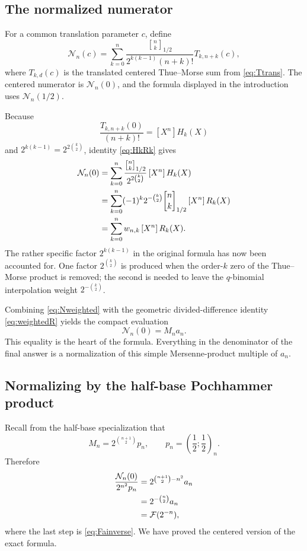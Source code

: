 \documentclass[11pt,oneside]{article}
\theoremstyle{definition}
\theoremstyle{remark}
\newcommand{\qpoch}[3]{\left(#1;#2\right)_{#3}}
\newcommand{\halfqbinom}[2]{{\genfrac{[}{]}{0pt}{}{#1}{#2}}_{1/2}}
\newcommand{\F}{\mathcal F}
\newcommand{\coeff}[2]{\left[#1^{#2}\right]}
\begin{document}
\subsection{The normalized numerator}

For a common translation parameter $c$, define
\begin{equation}\label{eq:Nncdef}
 \mathcal N_n(c)=
 \sum_{k=0}^{n}
 \frac{\halfqbinom{n}{k}}
      {2^{k(k-1)}(n+k)!}
 T_{k,n+k}(c),
\end{equation}
where $T_{k,d}(c)$ is the translated centered Thue--Morse sum from
\eqref{eq:Ttrans}.  The centered numerator is $\mathcal N_n(0)$, and the
formula displayed in the introduction uses $\mathcal N_n(1/2)$.

Because
\[
 \frac{T_{k,n+k}(0)}{(n+k)!}=\coeff{X}{n}H_k(X)
\]
and $2^{k(k-1)}=2^{2\binom{k}{2}}$, identity
\eqref{eq:HkRk} gives
\begin{align}
 \mathcal N_n(0)
 &=\sum_{k=0}^{n}
   \frac{\halfqbinom{n}{k}}{2^{2\binom{k}{2}}}
   \coeff{X}{n}H_k(X)\notag\\
 &=\sum_{k=0}^{n}
   (-1)^k2^{-\binom{k}{2}}\halfqbinom{n}{k}
   \coeff{X}{n}R_k(X)\notag\\
 &=\sum_{k=0}^{n}w_{n,k}\coeff{X}{n}R_k(X).\label{eq:Nweighted}
\end{align}
The rather specific factor $2^{k(k-1)}$ in the original formula has now
been accounted for.  One factor $2^{\binom{k}{2}}$ is produced when the
order-$k$ zero of the Thue--Morse product is removed; the second is needed
to leave the $q$-binomial interpolation weight
$2^{-\binom{k}{2}}$.

Combining \eqref{eq:Nweighted} with the geometric divided-difference
identity \eqref{eq:weightedR} yields the compact evaluation
\begin{equation}\label{eq:Ncenteredvalue}
 \boxed{\mathcal N_n(0)=M_na_n.}
\end{equation}
This equality is the heart of the formula.  Everything in the denominator
of the final answer is a normalization of this simple Mersenne-product
multiple of $a_n$.

\subsection{Normalizing by the half-base Pochhammer product}

Recall from the half-base specialization that
\begin{equation}\label{eq:Mnpnagain}
 M_n=2^{\binom{n+1}{2}}p_n,
 \qquad p_n=\qpoch{\frac12}{\frac12}{n}.
\end{equation}
Therefore
\begin{align}
 \frac{\mathcal N_n(0)}{2^{n^2}p_n}
 &=2^{\binom{n+1}{2}-n^2}a_n\notag\\
 &=2^{-\binom n2}a_n\notag\\
 &=\F(2^{-n}),\label{eq:normalizationfinish}
\end{align}
where the last step is \eqref{eq:Fainverse}.  We have proved the centered
version of the exact formula.
\end{document}
